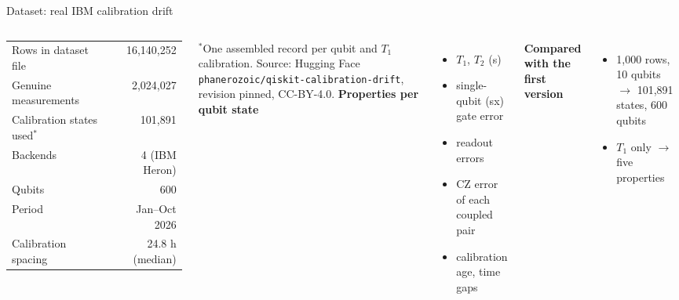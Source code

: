 \documentclass[aspectratio=169,11pt]{beamer}
\begin{document}
\begin{frame}{Dataset: real IBM calibration drift}
\begin{columns}[T]
\begin{table}
\small
\begin{tabular}{lr}
\toprule
Rows in dataset file & 16,140,252 \\
Genuine measurements & 2,024,027 \\
Calibration states used$^{*}$ & 101,891 \\
Backends & 4 (IBM Heron) \\
Qubits & 600 \\
Period & Jan--Oct 2026 \\
Calibration spacing & 24.8 h (median) \\
\bottomrule
\end{tabular}
\end{table}
{\scriptsize $^{*}$One assembled record per qubit and $T_1$ calibration. Source: Hugging Face \texttt{phanerozoic/qiskit-calibration-drift}, revision pinned, CC-BY-4.0.}
\textbf{Properties per qubit state}
\begin{itemize}
\item $T_1$, $T_2$ (\textmu s)
\item single-qubit (sx) gate error
\item readout errors
\item CZ error of each coupled pair
\item calibration age, time gaps
\end{itemize}
\textbf{Compared with the first version}
\begin{itemize}
\item 1,000 rows, 10 qubits $\rightarrow$ 101,891 states, 600 qubits
\item $T_1$ only $\rightarrow$ five properties
\end{itemize}
\end{columns}
\end{frame}
\end{document}
